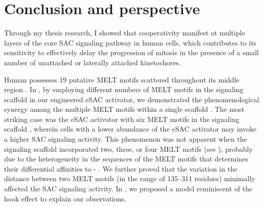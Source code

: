 \chapter{Conclusion and perspective}
\label{chpt:conclusion}

Through my thesis research, I showed that cooperativity manifest at multiple layers of the core SAC signaling pathway in human cells, which contributes to its sensitivity to effectively delay the progression of mitosis in the presence of a small number of unattached or laterally attached kinetochores.

Human  possesses 19 putative MELT motifs scattered throughout its middle region \cite{MELTEvolution}. In , by employing different numbers of MELT motifs in the signaling scaffold in our engineered eSAC activator, we demonstrated the phenomenological synergy among the multiple MELT motifs within a single scaffold \cite{eSAC}. The most striking case was the eSAC activator with six MELT motifs in the signaling scaffold , wherein cells with a lower abundance of the eSAC activator may invoke a higher SAC signaling activity. This phenomenon was not apparent when the signaling scaffold incorporated two, three, or four MELT motifs (see ), probably due to the heterogeneity in the sequences of the MELT motifs that determines their differential affinities to - \cite{MELTActivity, eSAC}. We further proved that the variation in the distance between two MELT motifs (in the range of 135--311 residues) minimally affected the SAC signaling activity. In , we proposed a model reminiscent of the hook effect to explain our observations.

